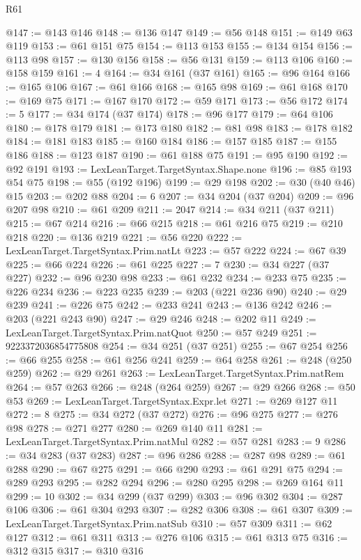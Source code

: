\begin{lexlean}{R61}
\begin{coremodule}
@147 := @143 @146
@148 := @136 @147
@149 := @56 @148
@151 := @149 @63 @119
@153 := @61 @151 @75
@154 := @113 @153
@155 := @134 @154
@156 := @113 @98
@157 := @130 @156
@158 := @56 @131
@159 := @113 @106
@160 := @158 @159
@161 := 4
@164 := @34 @161 (@37 @161)
@165 := @96 @164
@166 := @165 @106
@167 := @61 @166
@168 := @165 @98
@169 := @61 @168
@170 := @169 @75
@171 := @167 @170
@172 := @59 @171
@173 := @56 @172
@174 := 5
@177 := @34 @174 (@37 @174)
@178 := @96 @177
@179 := @64 @106
@180 := @178 @179
@181 := @173 @180
@182 := @81 @98
@183 := @178 @182
@184 := @181 @183
@185 := @160 @184
@186 := @157 @185
@187 := @155 @186
@188 := @123 @187
@190 := @61 @188 @75
@191 := @95 @190
@192 := @92 @191
@193 := LexLeanTarget.TargetSyntax.Shape.none
@196 := @85 @193 @54 @75
@198 := @55 (@192 @196)
@199 := @29 @198
@202 := @30 (@40 @46) @15
@203 := @202 @88
@204 := 6
@207 := @34 @204 (@37 @204)
@209 := @96 @207 @98
@210 := @61 @209
@211 := 2047
@214 := @34 @211 (@37 @211)
@215 := @67 @214
@216 := @66 @215
@218 := @61 @216 @75
@219 := @210 @218
@220 := @136 @219
@221 := @56 @220
@222 := LexLeanTarget.TargetSyntax.Prim.natLt
@223 := @57 @222
@224 := @67 @39
@225 := @66 @224
@226 := @61 @225
@227 := 7
@230 := @34 @227 (@37 @227)
@232 := @96 @230 @98
@233 := @61 @232
@234 := @233 @75
@235 := @226 @234
@236 := @223 @235
@239 := @203 (@221 @236 @90)
@240 := @29 @239
@241 := @226 @75
@242 := @233 @241
@243 := @136 @242
@246 := @203 (@221 @243 @90)
@247 := @29 @246
@248 := @202 @11
@249 := LexLeanTarget.TargetSyntax.Prim.natQuot
@250 := @57 @249
@251 := 9223372036854775808
@254 := @34 @251 (@37 @251)
@255 := @67 @254
@256 := @66 @255
@258 := @61 @256 @241
@259 := @64 @258
@261 := @248 (@250 @259)
@262 := @29 @261
@263 := LexLeanTarget.TargetSyntax.Prim.natRem
@264 := @57 @263
@266 := @248 (@264 @259)
@267 := @29 @266
@268 := @50 @53
@269 := LexLeanTarget.TargetSyntax.Expr.let
@271 := @269 @127 @11
@272 := 8
@275 := @34 @272 (@37 @272)
@276 := @96 @275
@277 := @276 @98
@278 := @271 @277
@280 := @269 @140 @11
@281 := LexLeanTarget.TargetSyntax.Prim.natMul
@282 := @57 @281
@283 := 9
@286 := @34 @283 (@37 @283)
@287 := @96 @286
@288 := @287 @98
@289 := @61 @288
@290 := @67 @275
@291 := @66 @290
@293 := @61 @291 @75
@294 := @289 @293
@295 := @282 @294
@296 := @280 @295
@298 := @269 @164 @11
@299 := 10
@302 := @34 @299 (@37 @299)
@303 := @96 @302
@304 := @287 @106
@306 := @61 @304 @293
@307 := @282 @306
@308 := @61 @307
@309 := LexLeanTarget.TargetSyntax.Prim.natSub
@310 := @57 @309
@311 := @62 @127
@312 := @61 @311
@313 := @276 @106
@315 := @61 @313 @75
@316 := @312 @315
@317 := @310 @316

\end{coremodule}
\end{lexlean}

